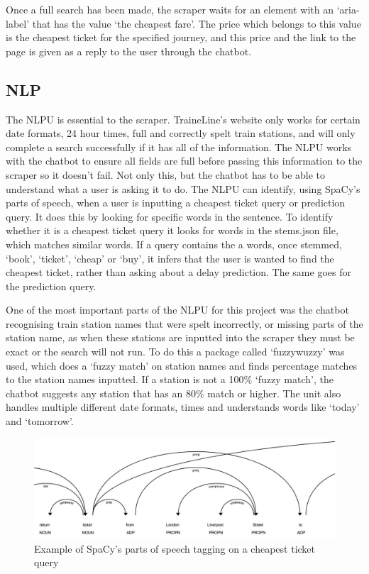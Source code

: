 \documentclass[11pt]{article}
\begin{document}
	Once a full search has been made, the scraper waits for an element with an `aria-label’ that has the value `the cheapest fare’. The price which belongs to this value is the cheapest ticket for the specified journey, and this price and the link to the page is given as a reply to the user through the chatbot.	
	
	\subsection{NLP}
	The NLPU is essential to the scraper. TraineLine’s website only works for certain date formats, 24 hour times, full and correctly spelt train stations, and will only complete a search successfully if it has all of the information. The NLPU works with the chatbot to ensure all fields are full before passing this information to the scraper so it doesn’t fail. Not only this, but the chatbot has to be able to understand what a user is asking it to do. The NLPU can identify, using SpaCy’s \citet{Spacydoc} parts of speech, when a user is inputting a cheapest ticket query or prediction query. It does this by looking for specific words in the sentence. To identify whether it is a cheapest ticket query it looks for words in the stems.json file, which matches similar words. If a query contains the a words, once stemmed,  `book’, `ticket’, `cheap’ or `buy’, it infers that the user is wanted to find the cheapest ticket, rather than asking about a delay prediction. The same goes for the prediction query. 
	
	One of the most important parts of the NLPU for this project was the chatbot recognising train station names that were spelt incorrectly, or missing parts of the station name, as when these stations are inputted into the scraper they must be exact or the search will not run. To do this a package called ‘fuzzywuzzy’ was used, which does a ‘fuzzy match’ on station names and finds percentage matches to the station names inputted. If a station is not a 100\% `fuzzy match’, the chatbot suggests any station that has an 80\% match or higher. The unit also handles multiple different date formats, times and understands words like ‘today’ and ‘tomorrow’. 
	
	\begin{figure}[!htb]
		\begin{center}
			\includegraphics[width=1\textwidth]{Resources/partsOfSpeechLarge.jpeg}
			\caption{Example of SpaCy's parts of speech tagging on a cheapest ticket query}
			\label{Img:Spacy}
		\end{center}
	\end{figure}
	
\end{document}
